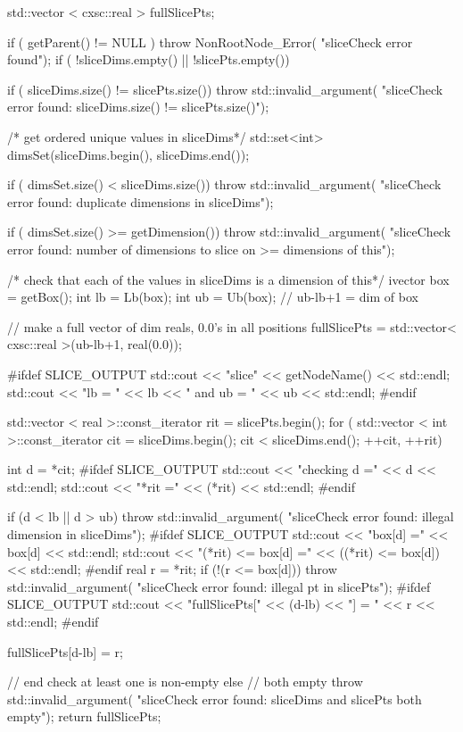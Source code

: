 \begin{DoxyCode}
  {
    std::vector < cxsc::real > fullSlicePts;
    
    if ( getParent() != NULL ) {
      throw NonRootNode_Error(
        "sliceCheck error found");
    }
    if ( !sliceDims.empty() || !slicePts.empty()) {
      
    
      if ( sliceDims.size() != slicePts.size()) {
        throw std::invalid_argument(
          "sliceCheck error found: sliceDims.size() != slicePts.size()");
      }
      
      /* get ordered unique values in sliceDims*/
      std::set<int> dimsSet(sliceDims.begin(), sliceDims.end());
      
      if ( dimsSet.size() < sliceDims.size()) {
        throw std::invalid_argument(
          "sliceCheck error found: duplicate dimensions in sliceDims");
      }
      
      if ( dimsSet.size() >= getDimension()) {
        throw std::invalid_argument(
          "sliceCheck error found: number of dimensions to slice on >=
       dimensions of this");
      }
      
      
      /* check that each of the values in sliceDims is a dimension of this*/
      ivector box = getBox();
      int lb = Lb(box);
      int ub = Ub(box);  // ub-lb+1 = dim of box
      
      // make a full vector of dim reals, 0.0's in all positions
      fullSlicePts =  std::vector< cxsc::real >(ub-lb+1, real(0.0));
      
      #ifdef SLICE_OUTPUT
        std::cout << "\nin slice" << getNodeName() << std::endl;
        std::cout << "lb = " << lb << " and ub = " << ub << std::endl;
      #endif
      
      std::vector < real >::const_iterator rit = slicePts.begin();
      for ( std::vector < int >::const_iterator cit = sliceDims.begin();
          cit < sliceDims.end();
          ++cit, ++rit) {
        int d = *cit;
        #ifdef SLICE_OUTPUT
          std::cout << "checking d =" << d << std::endl;
          std::cout << "*rit =" << (*rit) << std::endl;
        #endif
          
        if (d < lb || d > ub) {
          throw std::invalid_argument(
          "sliceCheck error found: illegal dimension in sliceDims");
        }
        #ifdef SLICE_OUTPUT
          std::cout << "box[d] =" << box[d] << std::endl;
          std::cout << "(*rit) <= box[d] =" << ((*rit) <= box[d]) << std::endl;
        #endif
        real r = *rit;
        if (!(r <= box[d])) {
          throw std::invalid_argument(
          "sliceCheck error found: illegal pt in slicePts");
        }
        #ifdef SLICE_OUTPUT
          std::cout << "fullSlicePts[" << (d-lb) << "] = " << r << std::endl;
        #endif
        
        fullSlicePts[d-lb] = r;
      }
      
    } // end check at least one is non-empty
    else  { // both empty
      throw std::invalid_argument(
        "sliceCheck error found: sliceDims and slicePts both empty");
    }
    return fullSlicePts;
  }
\end{DoxyCode}
